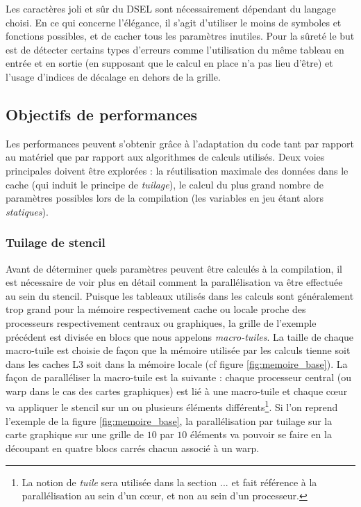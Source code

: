 Les caractères joli et sûr du DSEL sont nécessairement dépendant du langage choisi. En ce qui concerne l'élégance, il s'agit d'utiliser le moins de symboles et fonctions possibles, et de cacher tous les paramètres inutiles. Pour la sûreté le but est de détecter certains types d'erreurs comme l'utilisation du même tableau en entrée et en sortie (en supposant que le calcul en place n'a pas lieu d'être) et l'usage d'indices de décalage en dehors de la grille.

\subsection{Objectifs de performances}

Les performances peuvent s'obtenir grâce à l'adaptation du code tant par rapport au matériel que par rapport aux algorithmes de calculs utilisés. Deux voies principales doivent être explorées : la réutilisation maximale des données dans le cache (qui induit le principe de \emph{tuilage}), le calcul du plus grand nombre de paramètres possibles lors de la compilation (les variables en jeu étant alors \emph{statiques}).

\subsubsection*{Tuilage de stencil} 

Avant de déterminer quels paramètres peuvent être calculés à la compilation, il est nécessaire de voir plus en détail comment la parallélisation va être effectuée au sein du stencil. Puisque les tableaux utilisés dans les calculs sont généralement trop grand pour la mémoire respectivement cache ou locale proche des processeurs respectivement centraux ou graphiques, la grille de l'exemple précédent est divisée en blocs que nous appelons \emph{macro-tuiles}. La taille de chaque macro-tuile est choisie de façon que la mémoire utilisée par les calculs tienne soit dans les caches L3 soit dans la mémoire locale (cf figure \ref{fig:memoire_base}). La façon de paralléliser la macro-tuile est la suivante : chaque processeur central (ou warp dans le cas des cartes graphiques) est lié à une macro-tuile et chaque cœur va appliquer le stencil sur un ou plusieurs éléments différents\footnote{La notion de \emph{tuile} sera utilisée dans la section ... et fait référence à la parallélisation au sein d'un cœur, et non au sein d'un processeur.}. Si l'on reprend l'exemple de la figure \ref{fig:memoire_base}, la parallélisation par tuilage sur la carte graphique sur une grille de $10$ par $10$ éléments va pouvoir se faire en la découpant en quatre blocs carrés chacun associé à un warp.


